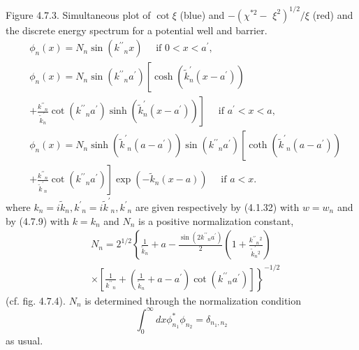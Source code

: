 \documentclass{article}
\begin{document}
Figure 4.7.3. Simultaneous plot of $\cot \xi$ (blue) and $-\left(\chi^{* 2}-\right.$ $\left.\xi^{2}\right)^{1 / 2} / \xi$ (red) and the discrete energy spectrum for a potential well and barrier.
$$
\begin{align*}
& \phi_{n}(x)=N_{n} \sin \left(k^{\prime \prime}{ }_{n} x\right) \quad \text { if } 0<x<a^{\prime},  \tag{4.7.40a}\\
& \phi_{n}(x)=N_{n} \sin \left(k^{\prime \prime}{ }_{n} a^{\prime}\right)\left[\cosh \left(\tilde{k}_{n}^{\prime}\left(x-a^{\prime}\right)\right)\right.  \tag{4.7.40b}\\
& \left.+\frac{k^{\prime \prime}{ }_{n}}{\tilde{k}_{n}^{\prime}} \cot \left(k^{\prime \prime}{ }_{n} a^{\prime}\right) \sinh \left(\tilde{k}_{n}^{\prime}\left(x-a^{\prime}\right)\right)\right] \quad \text { if } a^{\prime}<x<a, \\
& \phi_{n}(x)=N_{n} \sinh \left(\tilde{k}^{\prime}{ }_{n}\left(a-a^{\prime}\right)\right) \sin \left(k^{\prime \prime}{ }_{n} a^{\prime}\right)\left[\operatorname{coth}\left(\tilde{k}^{\prime}{ }_{n}\left(a-a^{\prime}\right)\right)\right.  \tag{4.7.40c}\\
& \left.+\frac{k^{\prime \prime}{ }_{n}}{\tilde{k}^{\prime}{ }_{n}} \cot \left(k^{\prime \prime}{ }_{n} a^{\prime}\right)\right] \exp \left(-\tilde{k}_{n}(x-a)\right) \quad \text { if } a<x .
\end{align*}
$$
where $k_{n}=i \tilde{k}_{n}, k^{\prime}{ }_{n}=i \tilde{k}^{\prime}{ }_{n}, k^{\prime}{ }_{n}$ are given respectively by (4.1.32) with $w=w_{n}$ and by (4.7.9) with $k=k_{n}$ and $N_{n}$ is a positive normalization constant,
$$
\begin{align*}
& N_{n}=2^{1 / 2}\left\{\frac{1}{\tilde{k}_{n}}+a-\frac{\sin \left(2 k^{\prime \prime}{ }_{n} a^{\prime}\right)}{2}\left(1+\frac{k^{\prime \prime}{ }_{n}{ }^{2}}{\tilde{k}_{n}^{\prime}{ }^{2}}\right)\right.  \tag{4.7.41}\\
& \left.\times\left[\frac{1}{k^{\prime \prime}{ }_{n}}+\left(\frac{1}{\tilde{k}_{n}}+a-a^{\prime}\right) \cot \left(k^{\prime \prime}{ }_{n} a^{\prime}\right)\right]\right\}^{-1 / 2}
\end{align*}
$$
(cf. fig. 4.7.4). $N_{n}$ is determined through the normalization condition
$$
\begin{equation*}
\int_{0}^{\infty} d x \phi_{n_{1}}^{*} \phi_{n_{2}}=\delta_{n_{1}, n_{2}} \tag{4.7.42}
\end{equation*}
$$
as usual.
\end{document}
